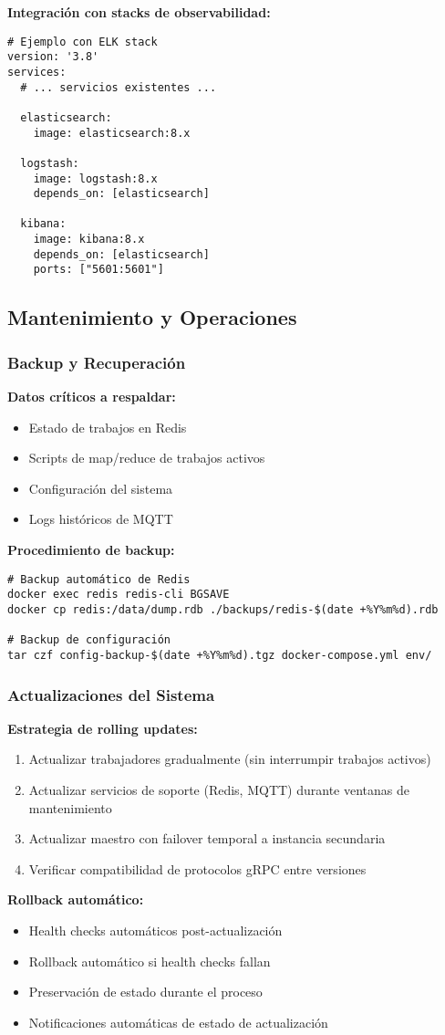 \textbf{Integración con stacks de observabilidad:}
\begin{verbatim}
# Ejemplo con ELK stack
version: '3.8'
services:
  # ... servicios existentes ...
  
  elasticsearch:
    image: elasticsearch:8.x
  
  logstash:
    image: logstash:8.x
    depends_on: [elasticsearch]
  
  kibana:
    image: kibana:8.x
    depends_on: [elasticsearch]
    ports: ["5601:5601"]
\end{verbatim}

\subsection{Mantenimiento y Operaciones}

\subsubsection{Backup y Recuperación}

\textbf{Datos críticos a respaldar:}
\begin{itemize}
    \item Estado de trabajos en Redis
    \item Scripts de map/reduce de trabajos activos
    \item Configuración del sistema
    \item Logs históricos de MQTT
\end{itemize}

\textbf{Procedimiento de backup:}
\begin{verbatim}
# Backup automático de Redis
docker exec redis redis-cli BGSAVE
docker cp redis:/data/dump.rdb ./backups/redis-$(date +%Y%m%d).rdb

# Backup de configuración
tar czf config-backup-$(date +%Y%m%d).tgz docker-compose.yml env/
\end{verbatim}

\subsubsection{Actualizaciones del Sistema}

\textbf{Estrategia de rolling updates:}
\begin{enumerate}
    \item Actualizar trabajadores gradualmente (sin interrumpir trabajos activos)
    \item Actualizar servicios de soporte (Redis, MQTT) durante ventanas de mantenimiento
    \item Actualizar maestro con failover temporal a instancia secundaria
    \item Verificar compatibilidad de protocolos gRPC entre versiones
\end{enumerate}

\textbf{Rollback automático:}
\begin{itemize}
    \item Health checks automáticos post-actualización
    \item Rollback automático si health checks fallan
    \item Preservación de estado durante el proceso
    \item Notificaciones automáticas de estado de actualización
\end{itemize}
